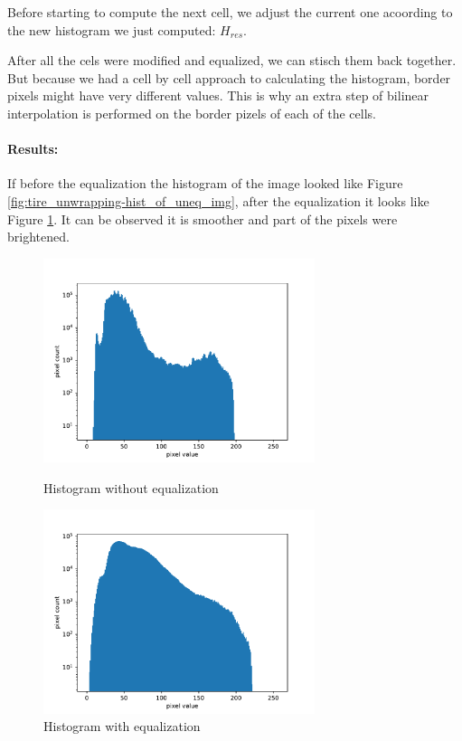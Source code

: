 Before starting to compute the next cell, we adjust the current one acoording to the new histogram we just computed: $H_{res}$.

After all the cels were modified and equalized, we can stisch them back together. But because we had a cell by cell approach to calculating the histogram, border pixels might have very different values. This is why an extra step of bilinear interpolation is performed on the border pizels of each of the cells.

\paragraph*{Results:}\mbox{}\par
If before the equalization the histogram of the image looked like Figure \ref{fig:tire_unwrapping-hist_of_uneq_img}, after the equalization it looks like Figure \ref{fig:tire_unwrapping-hist_of_eq_img}. It can be observed it is smoother and part of the pixels were brightened.

\begin{figure}
    \centering
    \begin{minipage}[c]{0.50\linewidth}
        \centering
        \includegraphics[width=7.95cm, keepaspectratio]{img/algos/tire_unwrapping-histogram_of_uneq_image.pdf}
        \caption{Histogram without equalization}
        \label{fig:tire_unwrapping-hist_of_uneq_img}
    \end{minipage}\hfill
    \begin{minipage}[c]{0.50\linewidth}
        \centering
        \includegraphics[width=7.95cm, keepaspectratio]{img/algos/tire_unwrapping-histogram_of_eq_image.pdf}
        \caption{Histogram with equalization}
        \label{fig:tire_unwrapping-hist_of_eq_img}
    \end{minipage}\hfill
\end{figure}

